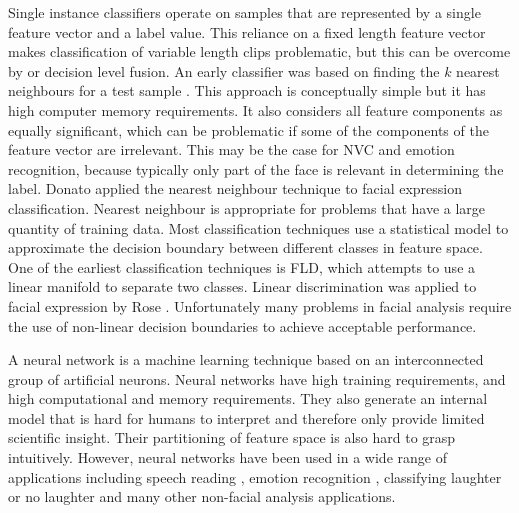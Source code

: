 Single instance classifiers operate on samples that are represented by a single feature vector and a label value. This reliance on a fixed length feature vector makes classification of variable length clips problematic, but this can be overcome by \featureGeneration or decision level fusion. An early classifier was based on finding the $k$ nearest neighbours for a test sample \cite{Cover1967}. This approach is conceptually simple but it has high computer memory requirements. It also considers all feature components as equally significant, which can be problematic if some of the components of the feature vector are irrelevant. This may be the case for \ac{NVC} and emotion recognition, because typically only part of the face is relevant in determining the label. Donato \etal \cite{Donato1999} applied the nearest neighbour technique to facial expression classification. Nearest neighbour is appropriate for problems that have a large quantity of training data. Most classification techniques use a statistical model to approximate the decision boundary between different classes in feature space. One of the earliest classification techniques is \ac{FLD}, which attempts to use a linear manifold to separate two classes. Linear discrimination was applied to facial expression by Rose \cite{Rose2006}. 
Unfortunately many problems in facial analysis require the use of non-linear decision boundaries to achieve acceptable performance.


A neural network is a machine learning technique based on an interconnected group of artificial neurons. Neural networks have high training requirements, and high computational and memory requirements. They also generate an internal model that is hard for humans to interpret and therefore only provide limited scientific insight. Their partitioning of feature space is also hard to grasp intuitively. However, neural networks have been used in a wide range of applications including speech reading \cite{Visser1999, Seguier2002}, emotion recognition \cite{Rosenblum1996, Petridis2009, Wollmer2009}, classifying laughter or no laughter \cite{Petridis2010} and many other non-facial analysis applications.

